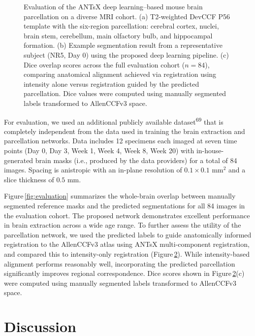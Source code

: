 \documentclass[
  12pt,
]{article}
\begin{document}
\begin{figure}
\begin{subfigure}{.75\textwidth}
  \caption{}
  \label{fig:subc}
\end{subfigure}
\caption{Evaluation of the ANTsX deep learning–based mouse brain parcellation on
a diverse MRI cohort. (a) T2-weighted DevCCF P56 template with the six-region
parcellation: cerebral cortex, nuclei, brain stem, cerebellum, main olfactory
bulb, and hippocampal formation. (b) Example segmentation result from a
representative subject (NR5, Day 0) using the proposed deep learning pipeline.
(c) Dice overlap scores across the full evaluation cohort ($n=84$), comparing
anatomical alignment achieved via registration using intensity alone versus
registration guided by the predicted parcellation. Dice values were computed
using manually segmented labels transformed to AllenCCFv3 space.}
\label{fig:evaluationParcellation}
\end{figure}

For evaluation, we used an additional publicly available
dataset\textsuperscript{69} that is completely independent from the data
used in training the brain extraction and parcellation networks. Data
includes 12 specimens each imaged at seven time points (Day 0, Day 3,
Week 1, Week 4, Week 8, Week 20) with in-house-generated brain masks
(i.e., produced by the data providers) for a total of 84 images. Spacing
is anistropic with an in-plane resolution of \(0.1 \times 0.1\) mm\(^2\)
and a slice thickness of \(0.5\) mm.

Figure\,\ref{fig:evaluation} summarizes the whole-brain overlap between
manually segmented reference masks and the predicted segmentations for
all 84 images in the evaluation cohort. The proposed network
demonstrates excellent performance in brain extraction across a wide age
range. To further assess the utility of the parcellation network, we
used the predicted labels to guide anatomically informed registration to
the AllenCCFv3 atlas using ANTsX multi-component registration, and
compared this to intensity-only registration
(Figure\,\ref{fig:evaluationParcellation}). While intensity-based
alignment performs reasonably well, incorporating the predicted
parcellation significantly improves regional correspondence. Dice scores
shown in Figure\,\ref{fig:evaluationParcellation}(c) were computed using
manually segmented labels transformed to AllenCCFv3 space. \clearpage
\newpage

\section{Discussion}\label{discussion}
\end{document}

